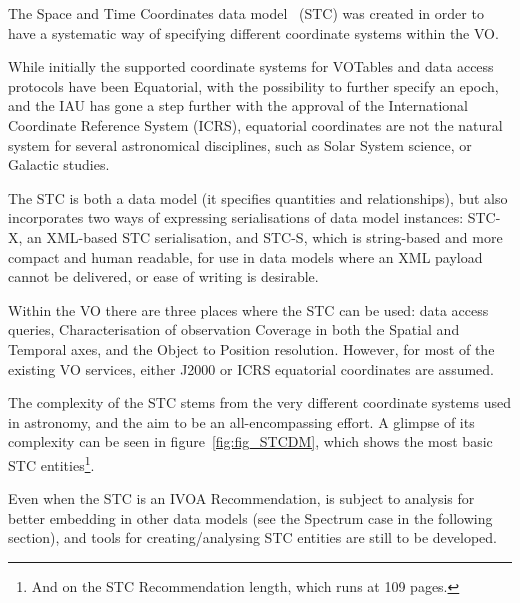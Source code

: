 			 The Space and Time Coordinates data
			model~\cite{2007stc..ivoa.....R} (STC) was created in
			order to have a systematic way of specifying different
			coordinate systems within the VO.
			
			 While initially the supported coordinate systems for
			VOTables and data access protocols have been Equatorial,
			with the possibility to further specify an epoch, 
			and the IAU has gone a step further with the approval
			of the International Coordinate Reference System (ICRS),
			equatorial coordinates are not
			the natural system for several astronomical disciplines,
			such as Solar System science, or Galactic studies.
			
			 The STC is both a data model (it specifies quantities
			and relationships), but also incorporates two ways of
			expressing serialisations of data model instances:
			STC-X, an XML-based STC serialisation,
			and STC-S, which is string-based and more compact
			and human readable, for use in data models
			where an XML payload cannot be delivered, or ease of
			writing is desirable.
			
			 Within the VO there are three places where the STC can
			be used: data access queries, Characterisation of
			observation Coverage in both the Spatial and Temporal
			axes, and the Object to Position resolution. However,
			for most of the existing VO services, either J2000 or
			ICRS equatorial coordinates are assumed.
			
			 The complexity of the STC stems from the very different
			coordinate systems used in astronomy, and the aim to be
			an all-encompassing effort. A glimpse of its complexity
			can be seen in figure~\ref{fig:fig_STCDM}, which shows
			the most basic STC entities\footnote{And on the STC 
			Recommendation length, which runs at 109 pages.}.
			
			Even when the STC is an IVOA Recommendation, is subject
			to analysis for better embedding in other data models
			(see the Spectrum case in the following section), and
			tools for creating/analysing STC entities are still to
			be developed.
			
